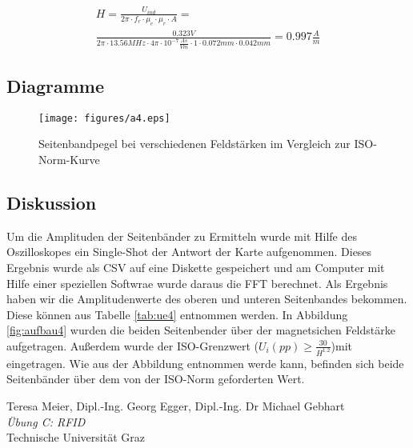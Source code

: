 \documentclass[12pt,a4paper,ngerman]{article}
\begin{document}
\begin{gather}
H = \frac{U_{ind}}{2\pi \cdot f_r \cdot \mu_e \cdot \mu_r \cdot A} = \\
\frac{0.323V}{2\pi \cdot 13.56MHz \cdot 4\pi \cdot 10^{-7}\frac{As}{Vm} \cdot 1 \cdot 0.072mm \cdot 0.042mm} = 0.997 \frac{A}{m}
\end{gather}

\subsection{Diagramme}
\begin{figure}[H]
\centering
\texttt{[image: figures/a4.eps]} 
\caption{Seitenbandpegel bei verschiedenen Feldstärken im Vergleich zur ISO-Norm-Kurve}
\label{fig:a4}
\end{figure}

\subsection{Diskussion}
Um die Amplituden der Seitenbänder zu Ermitteln wurde mit Hilfe des Oszilloskopes ein Single-Shot der Antwort der Karte aufgenommen. Dieses Ergebnis wurde als CSV auf eine Diskette gespeichert und am Computer mit Hilfe einer speziellen Softwrae wurde daraus die FFT berechnet. Als Ergebnis haben wir die Amplitudenwerte des oberen und unteren Seitenbandes bekommen. Diese können aus Tabelle \ref{tab:ue4} entnommen werden. In Abbildung \ref{fig:aufbau4} wurden die beiden Seitenbender über der magnetsichen Feldstärke aufgetragen. Außerdem wurde der ISO-Grenzwert ($U_i(pp)\geq\frac{30}{H^{1.2}}$)mit eingetragen. Wie aus der Abbildung entnommen werde kann, befinden sich beide Seitenbänder über dem von der ISO-Norm geforderten Wert.


\begin{thebibliography}{9}

  Teresa Meier, Dipl.-Ing. Georg Egger, Dipl.-Ing. Dr Michael Gebhart\\
  \emph{Übung C: RFID}\\
  Technische Universität Graz
\end{thebibliography}


 



   
\end{document}
